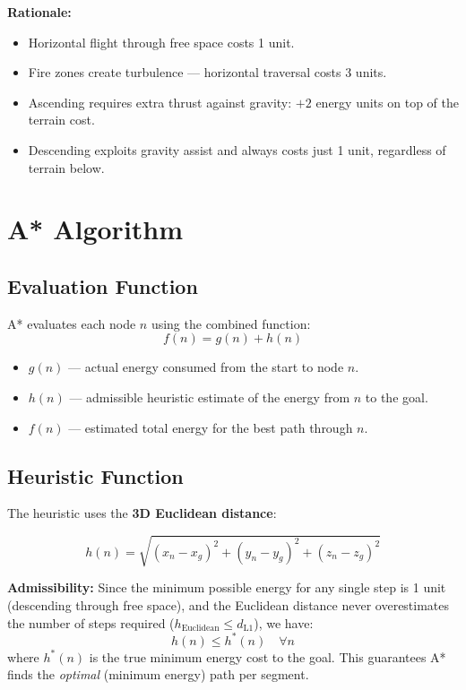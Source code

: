 \documentclass[12pt]{article}
\begin{document}
\textbf{Rationale:}
\begin{itemize}
    \item Horizontal flight through free space costs 1 unit.
    \item Fire zones create turbulence — horizontal traversal costs 3 units.
    \item Ascending requires extra thrust against gravity: $+2$ energy units on
          top of the terrain cost.
    \item Descending exploits gravity assist and always costs just 1 unit,
          regardless of terrain below.
\end{itemize}

\section{A* Algorithm}

\subsection{Evaluation Function}

A* evaluates each node $n$ using the combined function:
\begin{equation}
    f(n) = g(n) + h(n)
\end{equation}

\begin{itemize}
    \item $g(n)$ — actual energy consumed from the start to node $n$.
    \item $h(n)$ — admissible heuristic estimate of the energy from $n$ to the goal.
    \item $f(n)$ — estimated total energy for the best path through $n$.
\end{itemize}

\subsection{Heuristic Function}

The heuristic uses the \textbf{3D Euclidean distance}:

\begin{equation}
h(n) = \sqrt{(x_n - x_g)^2 + (y_n - y_g)^2 + (z_n - z_g)^2}
\end{equation}

\textbf{Admissibility:}
Since the minimum possible energy for any single step is 1 unit (descending
through free space), and the Euclidean distance never overestimates the
number of steps required ($h_{\text{Euclidean}} \leq d_{\text{L1}}$), we have:
\begin{equation}
h(n) \leq h^*(n) \quad \forall n
\end{equation}
where $h^*(n)$ is the true minimum energy cost to the goal.
This guarantees A* finds the \emph{optimal} (minimum energy) path per segment.
\end{document}
